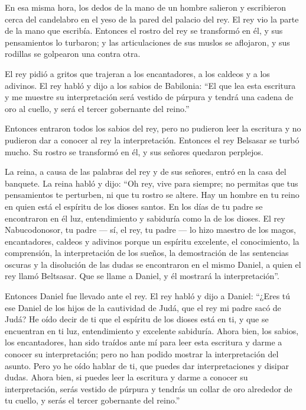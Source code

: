  En esa misma hora, los dedos de la mano de un hombre
salieron y escribieron cerca del candelabro en el yeso de la pared del
palacio del rey. El rey vio la parte de la mano que escribía.
 Entonces el rostro del rey se transformó en él, y sus
pensamientos lo turbaron; y las articulaciones de sus muslos se
aflojaron, y sus rodillas se golpearon una contra otra.

 El rey pidió a gritos que trajeran a los encantadores, a
los caldeos y a los adivinos. El rey habló y dijo a los sabios de
Babilonia: ``El que lea esta escritura y me muestre su interpretación
será vestido de púrpura y tendrá una cadena de oro al cuello, y será el
tercer gobernante del reino.''

 Entonces entraron todos los sabios del rey, pero no
pudieron leer la escritura y no pudieron dar a conocer al rey la
interpretación.  Entonces el rey Belsasar se turbó mucho.
Su rostro se transformó en él, y sus señores quedaron perplejos.

 La reina, a causa de las palabras del rey y de sus
señores, entró en la casa del banquete. La reina habló y dijo: ``Oh rey,
vive para siempre; no permitas que tus pensamientos te perturben, ni que
tu rostro se altere.  Hay un hombre en tu reino en quien
está el espíritu de los dioses santos. En los días de tu padre se
encontraron en él luz, entendimiento y sabiduría como la de los dioses.
El rey Nabucodonosor, tu padre --- sí, el rey, tu padre --- lo hizo
maestro de los magos, encantadores, caldeos y adivinos 
porque un espíritu excelente, el conocimiento, la comprensión, la
interpretación de los sueños, la demostración de las sentencias oscuras
y la disolución de las dudas se encontraron en el mismo Daniel, a quien
el rey llamó Beltsasar. Que se llame a Daniel, y él mostrará la
interpretación''.

 Entonces Daniel fue llevado ante el rey. El rey habló y
dijo a Daniel: ``¿Eres tú ese Daniel de los hijos de la cautividad de
Judá, que el rey mi padre sacó de Judá?  He oído decir de
ti que el espíritu de los dioses está en ti, y que se encuentran en ti
luz, entendimiento y excelente sabiduría.  Ahora bien,
los sabios, los encantadores, han sido traídos ante mí para leer esta
escritura y darme a conocer su interpretación; pero no han podido
mostrar la interpretación del asunto.  Pero yo he oído
hablar de ti, que puedes dar interpretaciones y disipar dudas. Ahora
bien, si puedes leer la escritura y darme a conocer su interpretación,
serás vestido de púrpura y tendrás un collar de oro alrededor de tu
cuello, y serás el tercer gobernante del reino.''

